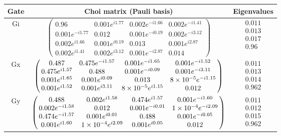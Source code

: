 {\begin{table}[h]
\begin{center}
\begin{tabular}[l]{|c|c|c|}
\hline
Gate & Choi matrix (Pauli basis) & Eigenvalues \\ \hline
Gi & $ \left(\!\!\begin{array}{cccc}
0.96 & 0.001e^{i1.77} & 0.002e^{-i1.66} & 0.002e^{-i1.41} \\ 
0.001e^{-i1.77} & 0.012 & 0.001e^{-i0.19} & 0.002e^{-i3.12} \\ 
0.002e^{i1.66} & 0.001e^{i0.19} & 0.013 & 0.001e^{i2.87} \\ 
0.002e^{i1.41} & 0.002e^{i3.12} & 0.001e^{-i2.87} & 0.014
 \end{array}\!\!\right) $
 & $ \begin{array}{c}
0.011 \\ 
0.013 \\ 
0.017 \\ 
0.96
 \end{array} $
 \\ \hline
Gx & $ \left(\!\!\begin{array}{cccc}
0.487 & 0.475e^{-i1.57} & 0.001e^{-i1.65} & 0.001e^{-i1.52} \\ 
0.475e^{i1.57} & 0.488 & 0.001e^{-i0.09} & 0.001e^{-i3.11} \\ 
0.001e^{i1.65} & 0.001e^{i0.09} & 0.013 & 8\times 10^{-5}e^{-i1.15} \\ 
0.001e^{i1.52} & 0.001e^{i3.11} & 8\times 10^{-5}e^{i1.15} & 0.012
 \end{array}\!\!\right) $
 & $ \begin{array}{c}
0.011 \\ 
0.013 \\ 
0.014 \\ 
0.962
 \end{array} $
 \\ \hline
Gy & $ \left(\!\!\begin{array}{cccc}
0.488 & 0.002e^{i1.58} & 0.474e^{i1.57} & 0.001e^{-i1.60} \\ 
0.002e^{-i1.58} & 0.012 & 0.001e^{-i0.01} & 1\times 10^{-4}e^{-i2.09} \\ 
0.474e^{-i1.57} & 0.001e^{i0.01} & 0.488 & 0.001e^{-i0.05} \\ 
0.001e^{i1.60} & 1\times 10^{-4}e^{i2.09} & 0.001e^{i0.05} & 0.012
 \end{array}\!\!\right) $
 & $ \begin{array}{c}
0.011 \\ 
0.012 \\ 
0.015 \\ 
0.962
 \end{array} $
 \\ \hline
\end{tabular}


\end{center}
\end{table}}
